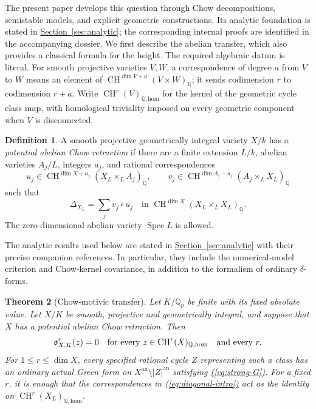 \documentclass[11pt,a4paper]{article}
\newtheorem{theorem}{Theorem}[section]
\theoremstyle{definition}
\newtheorem{definition}[theorem]{Definition}
\theoremstyle{remark}\newtheorem{remark}[theorem]{Remark}
\numberwithin{equation}{section}
\newcommand{\Q}{\mathbb Q}\newcommand{\R}{\mathbb R}\newcommand{\C}{\mathbb C}
\newcommand{\CH}{\operatorname{CH}}\newcommand{\an}{\mathrm{an}}
\newcommand{\homol}{\mathrm{hom}}\newcommand{\BC}{\mathrm{BC}}
\newcommand{\Spec}{\operatorname{Spec}}\newcommand{\Bl}{\operatorname{Bl}}
\newcommand{\secref}[1]{\hyperref[#1]{\textcolor{sectionlink}{Section~\ref*{#1}}}}
\renewcommand{\eqref}[1]{\hyperref[#1]{\textcolor{equationlink}{(\ref*{#1})}}}
\begin{document}
The present paper develops this question through Chow decompositions,
semistable models, and explicit geometric constructions. Its analytic
foundation is stated in \secref{sec:analytic}; the corresponding internal
proofs are identified in the accompanying dossier. We first describe the
abelian transfer, which also provides a classical formula for the height.
The required algebraic datum is literal.
For smooth projective varieties $V,W$, a correspondence of degree $a$ from
$V$ to $W$ means an element of
$\CH^{\dim V+a}(V\times W)_\Q$; it sends codimension $r$ to codimension
$r+a$. Write $\CH^r(V)_{\Q,\homol}$ for the kernel of the geometric
cycle class map, with homological triviality imposed on every geometric
component when $V$ is disconnected.

\begin{definition}\label{def:abelian-retraction}
A smooth projective geometrically integral variety $X/k$ has a
\emph{potential abelian Chow retraction} if there are a finite extension
$L/k$, abelian varieties $A_j/L$, integers $a_j$, and rational
correspondences
\[
 u_j\in\CH^{\dim X+a_j}(X_L\times_L A_j)_\Q,
 \qquad
 v_j\in\CH^{\dim A_j-a_j}(A_j\times_L X_L)_\Q
\]
such that
\begin{equation}\label{eq:diagonal-intro}
       \Delta_{X_L}=\sum_j v_j\circ u_j
       \quad\text{in }\CH^{\dim X}(X_L\times_L X_L)_\Q.
\end{equation}
The zero-dimensional abelian variety $\Spec L$ is allowed.
\end{definition}

The analytic results used below are stated in \secref{sec:analytic} with
their precise companion references. In particular, they include the
numerical-model criterion and Chow-kernel covariance, in addition to the
formalism of ordinary $\delta$-forms.

\begin{theorem}[Chow-motivic transfer]\label{thm:main}
Let $K/\Q_p$ be finite with its fixed absolute value. Let $X/K$ be smooth,
projective and geometrically integral, and suppose that $X$ has a potential
abelian Chow retraction. Then
\[
 \ob^r_{X,K}(z)=0
 \quad\text{for every }z\in\CH^r(X)_{\Q,\homol}
 \quad\text{and every }r.
\]
For $1\le r\le\dim X$, every specified rational cycle $Z$ representing
such a class has an ordinary actual Green form on
$X^{\an}\setminus |Z|^{\an}$ satisfying \eqref{eq:strong-G}.
For a fixed $r$, it is enough that the correspondences in
\eqref{eq:diagonal-intro} act as the identity on
$\CH^r(X_L)_{\Q,\homol}$.
\end{theorem}
\end{document}
